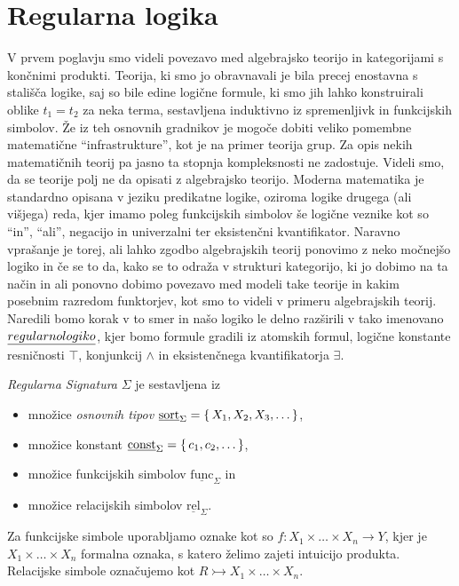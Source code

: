 \documentclass[../kategoricna_logika.tex]{subfiles}
\begin{document}
\section{Regularna logika}
V prvem poglavju smo videli povezavo med algebrajsko teorijo in
kategorijami s končnimi produkti.  Teorija, ki smo jo obravnavali je
bila precej enostavna s stališča logike, saj so bile edine logične
formule, ki smo jih lahko konstruirali oblike $t_1 = t_2$ za neka
terma, sestavljena induktivno iz spremenljivk in funkcijskih simbolov.
Že iz teh osnovnih gradnikov je mogoče dobiti veliko pomembne
matematične ``infrastrukture'', kot je na primer teorija grup.  Za
opis nekih matematičnih teorij pa jasno ta stopnja kompleksnosti ne
zadostuje.  Videli smo, da se teorije polj ne da opisati z algebrajsko
teorijo.  Moderna matematika je standardno opisana v jeziku predikatne
logike, oziroma logike drugega (ali višjega) reda, kjer imamo poleg
funkcijskih simbolov še logične veznike kot so ``in'', ``ali'',
negacijo in univerzalni ter eksistenčni kvantifikator.  Naravno
vprašanje je torej, ali lahko zgodbo algebrajskih teorij ponovimo z
neko močnejšo logiko in če se to da, kako se to odraža v strukturi
kategorijo, ki jo dobimo na ta način in ali ponovno dobimo povezavo
med modeli take teorije in kakim posebnim razredom funktorjev, kot smo
to videli v primeru algebrajskih teorij.  Naredili bomo korak v to
smer in našo logiko le delno razširili v tako imenovano
$\emph{regularno logiko}$, kjer bomo formule gradili iz atomskih
formul, logične konstante resničnosti $\top$, konjunkcij $\wedge$ in
eksistenčnega kvantifikatorja $\exists$.
\begin{definicija}
  \emph{Regularna Signatura} $\Sigma$ je sestavljena iz
  \begin{itemize}
  \item množice \emph{osnovnih tipov}
    $\underline{\mathrm{sort}}_\Sigma = \left\lbrace\,X_1, X_2, X_3, \ldots\,\right\rbrace$,
  \item množice konstant
    $\underline{\mathrm{const}}_\Sigma = \left\lbrace\,c_1, c_2, \ldots\,\right\rbrace$,
  \item množice funkcijskih simbolov
    $\underline{\mathrm{func}}_\Sigma$ in
  \item množice relacijskih simbolov
    $\underline{\mathrm{rel}}_\Sigma$.
  \end{itemize}
  Za funkcijske simbole uporabljamo oznake kot so
  $f : X_1 \times \ldots \times X_n \to Y$, kjer je
  $X_1 \times \ldots \times X_n$ formalna oznaka, s katero želimo
  zajeti intuicijo produkta.  Relacijske simbole označujemo kot
  $R \rightarrowtail X_1 \times \ldots \times X_n$.
\end{definicija}
\end{document}
